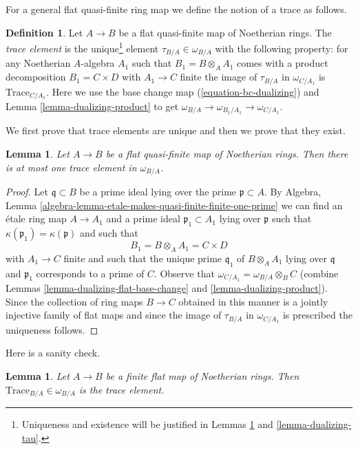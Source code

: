 \documentclass{stacks-project}
\theoremstyle{plain}
\newtheorem{lemma}[subsection]{Lemma}
\theoremstyle{definition}
\newtheorem{definition}[subsection]{Definition}
\theoremstyle{remark}
\numberwithin{equation}{subsection}
\begin{document}
\medskip\noindent
For a general flat quasi-finite ring map we define the notion
of a trace as follows.

\begin{definition}
\label{definition-trace-element}
Let $A \to B$ be a flat quasi-finite map of Noetherian rings.
The {\it trace element} is the unique\footnote{Uniqueness
and existence will be justified in
Lemmas \ref{lemma-trace-unique} and \ref{lemma-dualizing-tau}.}
element
$\tau_{B/A} \in \omega_{B/A}$
with the following property: for any Noetherian $A$-algebra $A_1$
such that $B_1 = B \otimes_A A_1$ comes with a
product decomposition $B_1 = C \times D$ with $A_1 \to C$ finite
the image of $\tau_{B/A}$ in $\omega_{C/A_1}$
is $\text{Trace}_{C/A_1}$.
Here we use the base change map (\ref{equation-bc-dualizing}) and
Lemma \ref{lemma-dualizing-product} to get
$\omega_{B/A} \to \omega_{B_1/A_1} \to \omega_{C/A_1}$.
\end{definition}

\noindent
We first prove that trace elements are unique and then
we prove that they exist.

\begin{lemma}
\label{lemma-trace-unique}
Let $A \to B$ be a flat quasi-finite map of Noetherian rings.
Then there is at most one trace element in $\omega_{B/A}$.
\end{lemma}

\begin{proof}
Let $\mathfrak q \subset B$ be a prime ideal lying over the prime
$\mathfrak p \subset A$. By
Algebra, Lemma \ref{algebra-lemma-etale-makes-quasi-finite-finite-one-prime}
we can find an \'etale ring map $A \to A_1$ and a prime
ideal $\mathfrak p_1 \subset A_1$ lying over $\mathfrak p$
such that $\kappa(\mathfrak p_1) = \kappa(\mathfrak p)$ and
such that
$$
B_1 = B \otimes_A A_1 = C \times D
$$
with $A_1 \to C$ finite and such that the unique prime $\mathfrak q_1$
of $B \otimes_A A_1$ lying over $\mathfrak q$ and $\mathfrak p_1$
corresponds to a prime of $C$. Observe that
$\omega_{C/A_1} = \omega_{B/A} \otimes_B C$
(combine Lemmas \ref{lemma-dualizing-flat-base-change} and
\ref{lemma-dualizing-product}). Since the collection
of ring maps $B \to C$ obtained in this manner is a jointly
injective family of flat maps and since the image of $\tau_{B/A}$
in $\omega_{C/A_1}$ is prescribed the uniqueness follows.
\end{proof}

\noindent
Here is a sanity check.

\begin{lemma}
\label{lemma-finite-flat-trace}
Let $A \to B$ be a finite flat map of Noetherian rings.
Then $\text{Trace}_{B/A} \in \omega_{B/A}$ is the trace element.
\end{lemma}
\end{document}
